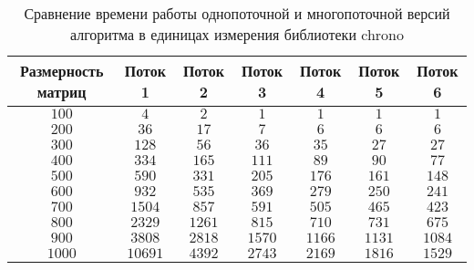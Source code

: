 \documentclass[12pt, a4paper]{report}
\begin{document}
	\begin{table}[ht!]
		\caption{Сравнение времени работы однопоточной и многопоточной версий алгоритма в единицах измерения библиотеки chrono}
		\label{table1}
		\begin{center}
			\begin{tabular}{|c|c|c|c|c|c|c|}
				\hline
				\bf{Размерность матриц} & \bf{Поток 1} & \bf{Поток 2} & \bf{Поток 3} & \bf{Поток 4} &\bf{Поток 5} & \bf{Поток 6} \\\hline
				
				$100$ & $4$ & $2$ & $1$ & $1$ & $1$ & $1$ \\ \hline
				
				$200$ & $36$ & $17$ & $7$ & $6$ & $6$ & $6$\\\hline
				
				$300$ & $128$ & $56$ & $36$ & $35$ & $27$ & $27$\\\hline
				
				$400$ & $334$ & $165$ & $111$ & $89$ & $90$ & $77$\\\hline
				
				$500$ & $590$ & $331$ & $205$ & $176$ & $161$ & $148$\\\hline
				
				$600$ & $932$ & $535$ & $369$ & $279$ & $250$ & $241$\\\hline
				
				$700$ & $1504$ & $857$ & $591$ & $505$ & $465$ & $423$\\\hline
				
				$800$ & $2329$ & $1261$ & $815$ & $710$ & $731$ & $675$\\\hline
							
			    $900$ & $3808$ & $2818$ & $1570$ & $1166$ & $1131$ & $1084$ \\\hline
				
				$1000$ & $10691$ & $4392$ & $2743$ & $2169$ & $1816$ & $1529$\\\hline
			\end{tabular}
		\end{center}
	\end{table}



	\newpage
\end{document}
